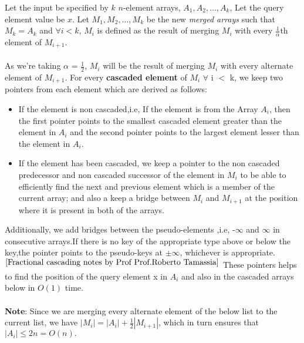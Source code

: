 \documentclass[11pt]{article}
\begin{document}
Let the input be specified by $k$ $n$-element arrays, $A_1,A_2,\dots,A_k$, Let the query element value be $x$.
Let $M_1,M_2,\dots,M_k$ be the new \textit{merged arrays} such that $M_k = A_k$ and $\forall i < k$, $M_i$ is defined as the result of merging $M_i$ with every $\frac{1}{\alpha}$th element of $M_{i+1}$. \\ \\
As we're taking $\alpha$ = $\frac{1}{2}$, $M_i$ will be the result of merging $M_i$ with every alternate element of $M_{i+1}$. For every \textbf{cascaded element} of $M_i$ $\forall$ i $<$ k, we keep two pointers from each element which are derived as follows:
\begin{itemize}
    \item If the element is non cascaded,i.e, If the element is from the Array $A_i$, then the first pointer points to the smallest cascaded element greater than the element in $A_i$ and the second pointer points to the largest element lesser than the element in $A_i$. 
 
    \item If the element has been cascaded, we keep a pointer to the non cascaded predecessor and non cascaded successor of the element in $M_i$ to be able to efficiently find the next and previous element which is a member of the current array; and also a keep a bridge between $M_i$ and $M_{i+1}$ at the position where it is present in both of the arrays.
\end{itemize}
Additionally, we add bridges between the pseudo-elements ,i.e,  -$\infty$ and $\infty$ in consecutive arrays.If there is no key of the appropriate type above or below the key,the pointer points to the pseudo-keys at $\pm \infty$, whichever is appropriate.$^{\cite{Fractional cascading notes by Prof Prof.Roberto Tamassia}}$
These pointers helps to find the position of the query element x in $A_i$ and also in the cascaded arrays below in $O(1)$ time. \\ \\
\textbf{Note}: Since we are merging every alternate element of the below list to the current list, we have 
$|M_i| = |A_i| +\frac{1}{2}|M_{i+1}|$, which in turn ensures that $|A_i| \leq 2n = O(n).$ \\
\end{document}
